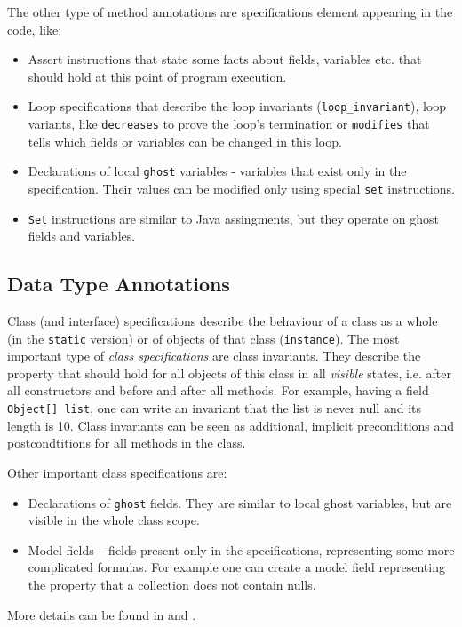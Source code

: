 \documentclass{acm_proc_article-sp}
\begin{document}
The other type of method annotations are specifications element appearing in the code, like:
\begin{itemize}
\item {Assert instructions that state some facts about fields, variables etc. that should hold at this point of program execution.}
\item {Loop specifications that describe the loop invariants (\texttt{loop\_invariant}), loop variants, like  \texttt{decreases} to prove the loop's termination or \texttt{modifies} that tells which fields or variables can be changed in this loop.}
\item{Declarations of local \texttt{ghost} variables - variables that exist only in the specification. Their values can be modified only using special \texttt{set} instructions.}
\item{\texttt{Set} instructions are similar to Java assingments, but they operate on ghost fields and variables.}
\end{itemize}
\subsection{Data Type Annotations}
Class (and interface) specifications describe the behaviour of a class as a whole (in the \texttt{static} version) or of objects of that class (\texttt{instance}). The most important type of \textit{class specifications} are class invariants. They describe the property that should hold for all objects of this class in all \textit{visible} states, i.e. after all constructors and before and after all methods. For example, having a field \texttt{Object[] list}, one can write an invariant that the list is never null and its length is 10. Class invariants can be seen as additional, implicit preconditions and postcondtitions for all methods in the class.

Other important class specifications are:
\begin{itemize}
\item {Declarations of \texttt{ghost} fields. They are similar to local ghost variables, but are visible in the whole class scope.}
\item {Model fields -- fields present only in the specifications, representing some more complicated formulas. For example one can create a model field representing the property that a collection does not contain nulls.}
\end{itemize}
More details can be found in \cite{jmlrefman} and \cite{bmlrefman}.
\end{document}
